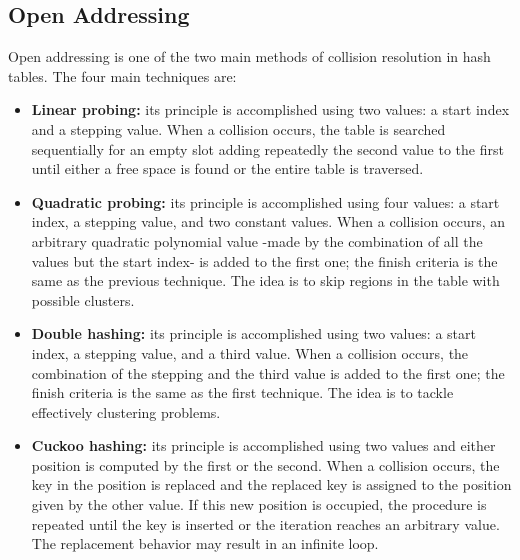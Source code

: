 \documentclass{article}
\begin{document}
\subsection{Open Addressing}
Open addressing is one of the two main methods of collision resolution in hash tables. The four main techniques are:

\begin{itemize}
    \item \textbf{Linear probing:} its principle is accomplished using two values: a start index and a stepping value. When a collision occurs, the table is searched sequentially for an empty slot adding repeatedly the second value to the first until either a free space is found or the entire table is traversed.
    \item \textbf{Quadratic probing:} its principle is accomplished using four values: a start index, a stepping value, and two constant values. When a collision occurs, an arbitrary quadratic polynomial value -made by the combination of all the values but the start index- is added to the first one; the finish criteria is the same as the previous technique. The idea is to skip regions in the table with possible clusters.
    \item \textbf{Double hashing:} its principle is accomplished using two values: a start index, a stepping value, and a third value. When a collision occurs, the combination of the stepping and the third value is added to the first one; the finish criteria is the same as the first technique. The idea is to tackle effectively clustering problems.
    \item \textbf{Cuckoo hashing:} its principle is accomplished using two values and either position is computed by the first or the second. When a collision occurs, the key in the position is replaced and the replaced key is assigned to the position given by the other value. If this new position is occupied, the procedure is repeated until the key is inserted or the iteration reaches an arbitrary value. The replacement behavior may result in an infinite loop. 
\end{itemize}
\end{document}
